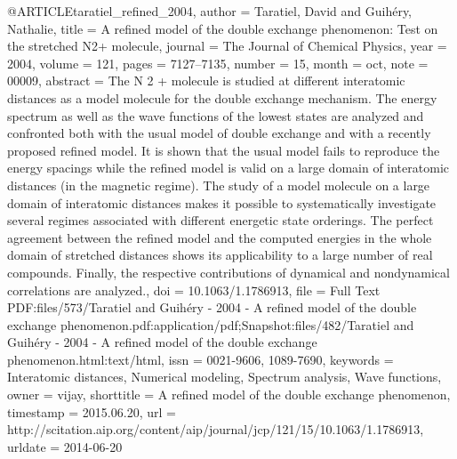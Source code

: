 @ARTICLE{taratiel_refined_2004,
  author = {Taratiel, David and Guihéry, Nathalie},
  title = {A refined model of the double exchange phenomenon: {Test} on the
	stretched {N}2+ molecule},
  journal = {The Journal of Chemical Physics},
  year = {2004},
  volume = {121},
  pages = {7127--7135},
  number = {15},
  month = oct,
  note = {00009},
  abstract = {The N 2 + molecule is studied at different interatomic distances as
	a model molecule for the double exchange mechanism. The energy spectrum
	as well as the wave functions of the lowest states are analyzed and
	confronted both with the usual model of double exchange and with
	a recently proposed refined model. It is shown that the usual model
	fails to reproduce the energy spacings while the refined model is
	valid on a large domain of interatomic distances (in the magnetic
	regime). The study of a model molecule on a large domain of interatomic
	distances makes it possible to systematically investigate several
	regimes associated with different energetic state orderings. The
	perfect agreement between the refined model and the computed energies
	in the whole domain of stretched distances shows its applicability
	to a large number of real compounds. Finally, the respective contributions
	of dynamical and nondynamical correlations are analyzed.},
  doi = {10.1063/1.1786913},
  file = {Full Text PDF:files/573/Taratiel and Guihéry - 2004 - A refined model of the double exchange phenomenon.pdf:application/pdf;Snapshot:files/482/Taratiel and Guihéry - 2004 - A refined model of the double exchange phenomenon.html:text/html},
  issn = {0021-9606, 1089-7690},
  keywords = {Interatomic distances, Numerical modeling, Spectrum analysis, Wave
	functions},
  owner = {vijay},
  shorttitle = {A refined model of the double exchange phenomenon},
  timestamp = {2015.06.20},
  url = {http://scitation.aip.org/content/aip/journal/jcp/121/15/10.1063/1.1786913},
  urldate = {2014-06-20}
}

